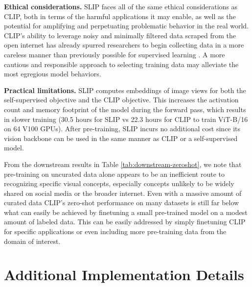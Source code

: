 \documentclass[10pt,twocolumn,letterpaper]{article}
\renewcommand{\paragraph}[1]{\vspace{1.25mm}\noindent\textbf{#1}}
\begin{document}
\paragraph{Ethical considerations.}
SLIP faces all of the same ethical considerations as CLIP, both in terms of the harmful applications it may enable, as well as the potential for amplifying and perpetuating problematic behavior in the real world.
CLIP's ability to leverage noisy and minimally filtered data scraped from the open internet has already spurred researchers to begin collecting data in a more careless manner than previously possible for supervised learning \cite{Birhane2021MultimodalDM}.
A more cautious and responsible approach to selecting training data may alleviate the most egregious model behaviors.

\paragraph{Practical limitations.}
SLIP computes embeddings of image views for both the self-supervised objective and the CLIP objective.
This increases the activation count and memory footprint of the model during the forward pass, which results in slower training (30.5 hours for SLIP vs 22.3 hours for CLIP to train ViT-B/16 on 64 V100 GPUs).
After pre-training, SLIP incurs no additional cost since its vision backbone can be used in the same manner as CLIP or a self-supervised model.

From the downstream results in Table \ref{tab:downstream-zeroshot}, we note that pre-training on uncurated data alone appears to be an inefficient route to recognizing specific visual concepts, especially concepts unlikely to be widely shared on social media or the broader internet.
Even with a massive amount of curated data CLIP's zero-shot performance on many datasets is still far below what can easily be achieved by finetuning a small pre-trained model on a modest amount of labeled data.
This can be easily addressed by simply finetuning CLIP for specific applications or even including more pre-training data from the domain of interest.

\vfill
{\small}

\clearpage
\newpage
\appendix

\section{Additional Implementation Details}
\end{document}
